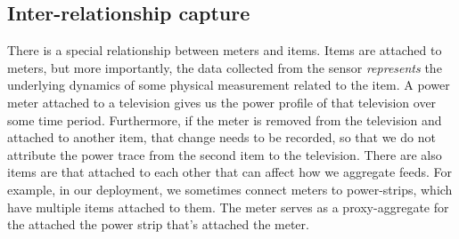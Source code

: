 


\subsection{Inter-relationship capture}
\label{sec:binding}
There is a special relationship between meters and items.  Items are attached to meters, but more importantly, the data
collected from the sensor \emph{represents} the underlying dynamics of some physical measurement related to the item.  A power 
meter attached to a television gives us the power profile of that television over some time period.  Furthermore, if the meter 
is removed
from the television and attached to another item, that change needs to be recorded, so that we do not attribute the power
trace from the second item to the television.  There are also items are that attached to each other that can affect how we 
aggregate feeds.  For example, in our deployment, we sometimes connect meters to power-strips, which have multiple items
attached to them.  The meter serves as a proxy-aggregate for the attached the power strip that's attached the meter.

